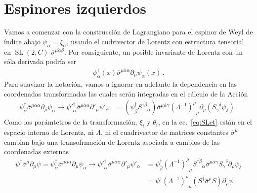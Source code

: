 \section{Espinores izquierdos}
\begin{frame}
Vamos a comenzar con la construcción de Lagrangiano para el espinor de Weyl de índice abajo
$\psi_{\alpha}=\xi_{\alpha}$, usando el cudrivector de Lorentz con estructura tensorial en $\operatorname{SL}(2,C)$ $\overline{\sigma}^{\mu\dot{\alpha}\beta}$.
Por consiguiente, un posible invariante de Lorentz con un sóla derivada podría ser
 \begin{align}
   {\psi}^{\dagger}_{\dot{\alpha}}(x)\overline{\sigma}^{\mu\dot{\alpha}\alpha}\partial_\mu\psi_{\alpha}(x)\,.
\end{align}
Para suavizar la notación, vamos a ignorar en adelante la dependencia en las coordenadas transformadas las cuales serán integradas en el cálculo de la Acción
\begin{align}
     {\psi}^{\dagger}_{\dot{\alpha}}\overline{\sigma}^{\mu\dot{\alpha}\alpha}\partial_\mu\psi_{\alpha}\to  {\psi'}^{\dagger}_{\dot{\alpha}}\overline{\sigma}^{\mu\dot{\alpha}\alpha}\partial'_\mu\psi'_{\alpha}
&=
\left( {\psi}^{\dagger}_{\dot{\beta}}  {S^{\dagger\dot{\beta}}}_{\dot{\alpha}} \right)\overline{\sigma}^{\mu\dot{\alpha\gamma}}{\left(\Lambda^{-1}\right)^\rho}_\mu\partial_\rho \left( {S_{\gamma}}^{\delta}\psi_\delta \right)\,.
 \end{align} 
 Como los parámtetros de la transformación, $\xi_i$ y $\theta_i$, en la ec.~\eqref{eq:SLet} están en el espacio interno de Lorentz, 
 ni $\Lambda$, ni el cuadrivector de matrices constantes $\overline{\sigma}^{\mu}$ cambian bajo una transofrmación de Lorentz asociada a cambios de las coordenadas externas
\begin{align}
  {\psi}^{\dagger}\overline{\sigma}^\mu\partial_\mu\psi
  =    {\psi}^{\dagger}_{\dot{\alpha}}\overline{\sigma}^{\mu\dot{\alpha}\alpha}\partial_\mu\psi_{\alpha}\to  {\psi'}^{\dagger}_{\dot{\alpha}}\overline{\sigma}^{\mu\dot{\alpha}\alpha}\partial'_\mu\psi'_{\alpha}&=
{\psi}^{\dagger}_{\dot{\beta}}{\left(\Lambda^{-1}\right)^\rho}_\mu {S^{\dagger\dot{\beta}}}_{\dot{\alpha}}\overline{\sigma}^{\mu\dot{\alpha\gamma}}{S_{\gamma}}^{\delta} \partial_\rho  \psi_\delta \nonumber\\
&=\psi^\dagger {\left(\Lambda^{-1}\right)^\rho}_\mu \left(S^\dagger \overline{\sigma}^\mu S\right)\partial_\rho\psi\nonumber\\

\end{align}
\end{frame}
